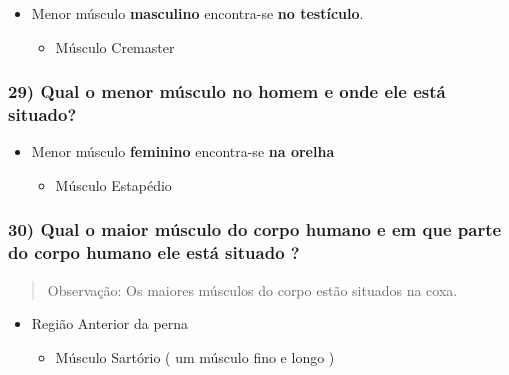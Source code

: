 \documentclass[
]{book}
\providecommand{\tightlist}{%
  \setlength{\itemsep}{0pt}\setlength{\parskip}{0pt}}
\begin{document}
\begin{itemize}
\tightlist
\item
  Menor músculo \textbf{masculino} encontra-se \textbf{no testículo}.

  \begin{itemize}
  \tightlist
  \item
    Músculo Cremaster
  \end{itemize}
\end{itemize}

\hypertarget{qual-o-menor-muxfasculo-no-homem-e-onde-ele-estuxe1-situado-1}{%
\subsubsection*{29) Qual o menor músculo no homem e onde ele está situado?}\label{qual-o-menor-muxfasculo-no-homem-e-onde-ele-estuxe1-situado-1}}

\begin{itemize}
\tightlist
\item
  Menor músculo \textbf{feminino} encontra-se \textbf{na orelha}

  \begin{itemize}
  \tightlist
  \item
    Músculo Estapédio
  \end{itemize}
\end{itemize}

\hypertarget{qual-o-maior-muxfasculo-do-corpo-humano-e-em-que-parte-do-corpo-humano-ele-estuxe1-situado}{%
\subsubsection*{30) Qual o maior músculo do corpo humano e em que parte do corpo humano ele está situado ?}\label{qual-o-maior-muxfasculo-do-corpo-humano-e-em-que-parte-do-corpo-humano-ele-estuxe1-situado}}

\begin{quote}
Observação: Os maiores músculos do corpo estão situados na coxa.
\end{quote}

\begin{itemize}
\tightlist
\item
  Região Anterior da perna

  \begin{itemize}
  \tightlist
  \item
    Músculo Sartório ( um músculo fino e longo )
  \end{itemize}
\end{itemize}
\end{document}
